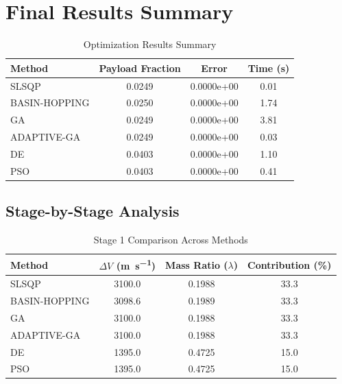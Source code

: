 \documentclass{article}
\begin{document}
\section{Final Results Summary}
\begin{table}[H]
\centering
\caption{Optimization Results Summary}
\begin{tabular}{lS[table-format=1.4]S[table-format=1.4e-1]S[table-format=1.2]}
\toprule
Method & {Payload Fraction} & {Error} & {Time (\si{\second})} \\
\midrule
SLSQP        & 0.0249 & 0.0000e+00 & 0.01 \\
BASIN-HOPPING & 0.0250 & 0.0000e+00 & 1.74 \\
GA           & 0.0249 & 0.0000e+00 & 3.81 \\
ADAPTIVE-GA  & 0.0249 & 0.0000e+00 & 0.03 \\
DE           & 0.0403 & 0.0000e+00 & 1.10 \\
PSO          & 0.0403 & 0.0000e+00 & 0.41 \\
\bottomrule
\end{tabular}
\end{table}

\subsection{Stage-by-Stage Analysis}


\begin{table}[H]
\centering
\caption{Stage 1 Comparison Across Methods}
\begin{tabular}{lS[table-format=4.1]S[table-format=1.4]S[table-format=3.1]}
\toprule
Method & {$\Delta V$ (\si{\meter\per\second})} & {Mass Ratio ($\lambda$)} & {Contribution (\%)} \\
\midrule
SLSQP        & 3100.0 & 0.1988 & 33.3 \\
BASIN-HOPPING & 3098.6 & 0.1989 & 33.3 \\
GA           & 3100.0 & 0.1988 & 33.3 \\
ADAPTIVE-GA  & 3100.0 & 0.1988 & 33.3 \\
DE           & 1395.0 & 0.4725 & 15.0 \\
PSO          & 1395.0 & 0.4725 & 15.0 \\
\bottomrule
\end{tabular}
\end{table}
\end{document}
